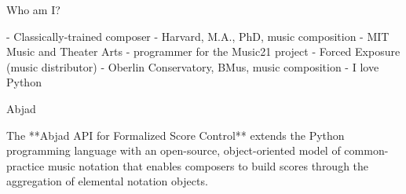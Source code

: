 \begin{frame}[fragile]{Who am I?}
\begin{markdown}
- Classically-trained composer
- Harvard, M.A., PhD, music composition
- MIT Music and Theater Arts
    - programmer for the Music21 project
- Forced Exposure (music distributor)
- Oberlin Conservatory, BMus, music composition
- I love Python
\end{markdown}
\end{frame}

\begin{frame}[fragile]{Abjad}
\begin{markdown}
The **Abjad API for Formalized Score Control** extends the Python
programming language with an open-source, object-oriented model of
common-practice music notation that enables composers to build scores
through the aggregation of elemental notation objects.
\end{markdown}
\end{frame}